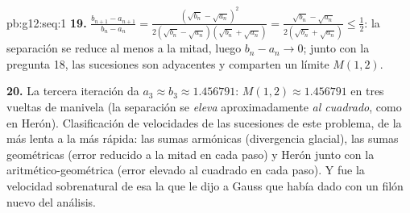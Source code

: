 \begin{solution}{pb:g12:seq:1}
\textbf{19.} $\frac{b_{n+1} - a_{n+1}}{b_n - a_n} =
\frac{(\sqrt{b_n} - \sqrt{a_n})^2}
{2(\sqrt{b_n} - \sqrt{a_n})(\sqrt{b_n} + \sqrt{a_n})}
= \frac{\sqrt{b_n} - \sqrt{a_n}}{2(\sqrt{b_n} + \sqrt{a_n})}
\leq \frac12$: la separación se reduce al menos a la mitad, luego
$b_n - a_n \to 0$; junto con la pregunta 18, las sucesiones son adyacentes
y comparten un límite $M(1, 2)$.

\textbf{20.} La tercera iteración da
$a_3 \approx b_3 \approx 1.456791$: $M(1, 2) \approx 1.456791$ en tres
vueltas de manivela (la separación se \emph{eleva} aproximadamente
\emph{al cuadrado}, como en Herón). Clasificación de velocidades de las
sucesiones de este problema, de la más lenta a la más rápida: las sumas
armónicas (divergencia glacial), las sumas geométricas (error reducido a
la mitad en cada paso) y Herón junto con la  aritmético-geométrica
(error elevado al cuadrado en cada paso). Y fue la velocidad sobrenatural
de esa  la que le dijo a Gauss que había dado con un filón nuevo del
análisis.
\end{solution}
